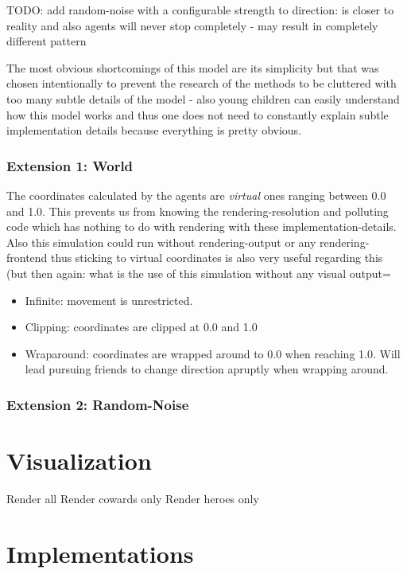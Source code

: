 TODO: add random-noise with a configurable strength to direction: is closer to reality and also agents will never stop completely - may result in completely different pattern

The most obvious shortcomings of this model are its simplicity but that was chosen intentionally to prevent the research of the methods to be cluttered with too many subtle details of the model - also young children can easily understand how this model works and thus one does not need to constantly explain subtle implementation details because everything is pretty obvious. 

\subsubsection{Extension 1: World}

The coordinates calculated by the agents are \textit{virtual} ones ranging between 0.0 and 1.0. This prevents us from knowing the rendering-resolution and polluting code which has nothing to do with rendering with these implementation-details. Also this simulation could run without rendering-output or any rendering-frontend thus sticking to virtual coordinates is also very useful regarding this (but then again: what is the use of this simulation without any visual output=

\begin{itemize}
\item Infinite: movement is unrestricted.
\item Clipping: coordinates are clipped at 0.0 and 1.0 
\item Wraparound: coordinates are wrapped around to 0.0 when reaching 1.0. Will lead pursuing friends to change direction apruptly when wrapping around.
\end{itemize}

\subsubsection{Extension 2: Random-Noise}


\section{Visualization}
Render all
Render cowards only
Render heroes only

\section{Implementations}
